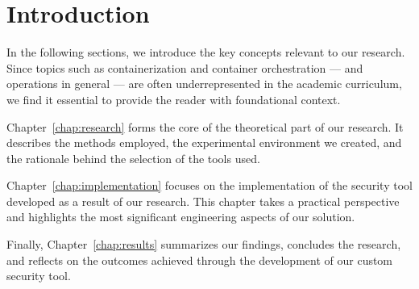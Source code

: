 \chapter{Introduction}

In the following sections, we introduce the key concepts relevant to our research. Since topics such as containerization and container orchestration — and operations in general — are often underrepresented in the academic curriculum, we find it essential to provide the reader with foundational context.

Chapter~\ref{chap:research} forms the core of the theoretical part of our research. It describes the methods employed, the experimental environment we created, and the rationale behind the selection of the tools used.

Chapter~\ref{chap:implementation} focuses on the implementation of the security tool developed as a result of our research. This chapter takes a practical perspective and highlights the most significant engineering aspects of our solution.

Finally, Chapter~\ref{chap:results} summarizes our findings, concludes the research, and reflects on the outcomes achieved through the development of our custom security tool.







